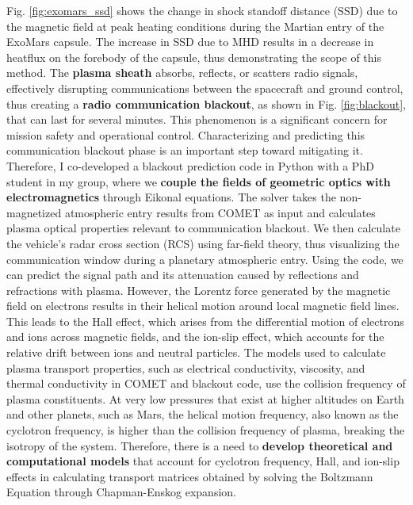 \documentclass[11pt,sans]{wlscirep} %
\begin{document}
\noindent Fig. \ref{fig:exomars_ssd}\cite{sharma2024mhd} shows the change in shock standoff distance (SSD) due to the magnetic field at peak heating conditions during the Martian entry of the ExoMars capsule. The increase in SSD due to MHD results in a decrease in heatflux on the forebody of the capsule, thus demonstrating the scope of this method.
\noindent The \textbf{plasma sheath} absorbs, reflects, or scatters radio signals, effectively disrupting communications between the spacecraft and ground control, thus creating a \textbf{radio communication blackout}, as shown in Fig. \ref{fig:blackout}, that can last for several minutes. This phenomenon is a significant concern for mission safety and operational control. Characterizing and predicting this communication blackout phase is an important step toward mitigating it. Therefore, I co-developed a blackout prediction code in Python with a PhD student in my group\cite{giangaspero20233d}, where we \textbf{couple the fields of geometric optics with electromagnetics} through Eikonal equations. The solver takes the non-magnetized atmospheric entry results from COMET as input and calculates plasma optical properties relevant to communication blackout. 
\noindent We then calculate the vehicle's radar cross section (RCS) using far-field theory, thus visualizing the communication window during a planetary atmospheric entry\cite{giangaspero2024raytracing}. 
Using the code, we can predict the signal path and its attenuation caused by reflections and refractions with plasma. 
However, the Lorentz force generated by the magnetic field on electrons results in their helical motion around local magnetic field lines. This leads to the Hall effect, which arises from the differential motion of electrons and ions across magnetic fields, and the ion-slip effect, which accounts for the relative drift between ions and neutral particles\cite{bruno2008transport}. The models used to calculate plasma transport properties, such as electrical conductivity, viscosity, and thermal conductivity in COMET and blackout code, use the collision frequency of plasma constituents. At very low pressures that exist at higher altitudes on Earth and other planets, such as Mars, the helical motion frequency, also known as the cyclotron frequency, is higher than the collision frequency of plasma, breaking the isotropy of the system. Therefore, there is a need to \textbf{develop theoretical and computational models} that account for cyclotron frequency, Hall, and ion-slip effects in calculating transport matrices obtained by solving the Boltzmann Equation through Chapman-Enskog expansion. 
\end{document}

